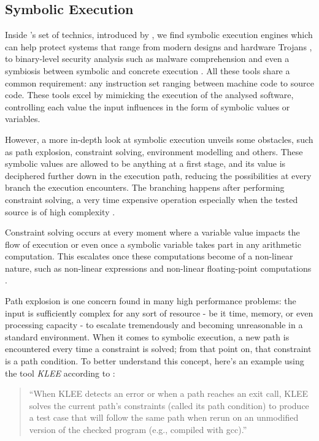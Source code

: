 \subsection{Symbolic Execution}
Inside 's set of technics, introduced by \cite{King1976}, we find symbolic execution engines which can help protect systems that range from modern  designs and hardware Trojans \cite{Vafaei2021}, to binary-level security analysis such as malware comprehension \cite{David2016} and even a symbiosis between symbolic and concrete execution \cite{Gritti2020}.
All these tools share a common requirement: any instruction set ranging between machine code to source code. These tools excel by mimicking the execution of the analysed software, controlling each value the input influences in the form of symbolic values or variables.

However, a more in-depth look at symbolic execution unveils some obstacles, such as path explosion, constraint solving, environment modelling and others. These symbolic values are allowed to be anything at a first stage, and its value is deciphered further down in the execution path, reducing the possibilities at every branch the execution encounters. The branching happens after performing constraint solving, a very time expensive operation especially when the tested source is of high complexity \cite{Zhang2022}. 

Constraint solving occurs at every moment where a variable value impacts the flow of execution or even once a symbolic variable takes part in any arithmetic computation. This escalates once these computations become of a non-linear nature, such as non-linear expressions and non-linear floating-point computations \cite{Kroening2008}.

Path explosion is one concern found in many high performance problems: the input is sufficiently complex for any sort of resource - be it time, memory, or even processing capacity - to escalate tremendously and becoming unreasonable in a standard environment. When it comes to symbolic execution, a new path is encountered every time a constraint is solved; from that point on, that constraint is a path condition. To better understand this concept, here's an example using the tool \textit{KLEE} according to \cite[p. 3]{Cadar2008}: 
\begin{quote}
``When KLEE detects an error or when a path reaches an exit call, KLEE solves the current path's constraints (called its path condition) to produce a test case that will follow the same path when rerun on an unmodified version of the checked program (e.g., compiled with gcc).''
\end{quote}

